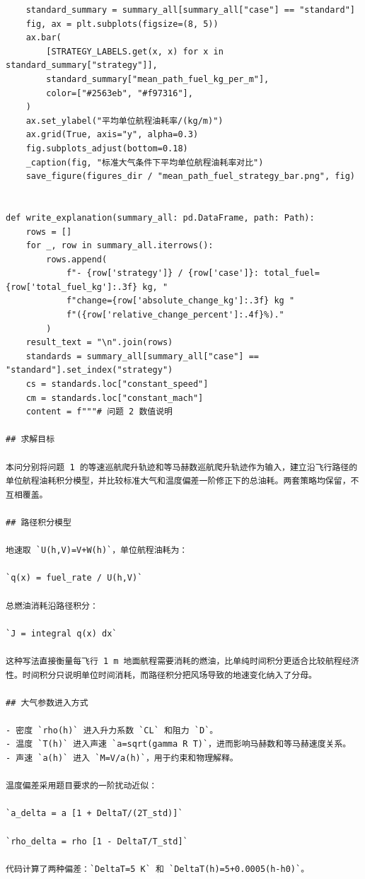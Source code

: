 \documentclass[withoutpreface,bwprint]{cumcmthesis} %
\begin{document}
\begin{center}
\begin{lstlisting}
    standard_summary = summary_all[summary_all["case"] == "standard"]
    fig, ax = plt.subplots(figsize=(8, 5))
    ax.bar(
        [STRATEGY_LABELS.get(x, x) for x in standard_summary["strategy"]],
        standard_summary["mean_path_fuel_kg_per_m"],
        color=["#2563eb", "#f97316"],
    )
    ax.set_ylabel("平均单位航程油耗率/(kg/m)")
    ax.grid(True, axis="y", alpha=0.3)
    fig.subplots_adjust(bottom=0.18)
    _caption(fig, "标准大气条件下平均单位航程油耗率对比")
    save_figure(figures_dir / "mean_path_fuel_strategy_bar.png", fig)


def write_explanation(summary_all: pd.DataFrame, path: Path):
    rows = []
    for _, row in summary_all.iterrows():
        rows.append(
            f"- {row['strategy']} / {row['case']}: total_fuel={row['total_fuel_kg']:.3f} kg, "
            f"change={row['absolute_change_kg']:.3f} kg "
            f"({row['relative_change_percent']:.4f}%)."
        )
    result_text = "\n".join(rows)
    standards = summary_all[summary_all["case"] == "standard"].set_index("strategy")
    cs = standards.loc["constant_speed"]
    cm = standards.loc["constant_mach"]
    content = f"""# 问题 2 数值说明

## 求解目标

本问分别将问题 1 的等速巡航爬升轨迹和等马赫数巡航爬升轨迹作为输入，建立沿飞行路径的单位航程油耗积分模型，并比较标准大气和温度偏差一阶修正下的总油耗。两套策略均保留，不互相覆盖。

## 路径积分模型

地速取 `U(h,V)=V+W(h)`，单位航程油耗为：

`q(x) = fuel_rate / U(h,V)`

总燃油消耗沿路径积分：

`J = integral q(x) dx`

这种写法直接衡量每飞行 1 m 地面航程需要消耗的燃油，比单纯时间积分更适合比较航程经济性。时间积分只说明单位时间消耗，而路径积分把风场导致的地速变化纳入了分母。

## 大气参数进入方式

- 密度 `rho(h)` 进入升力系数 `CL` 和阻力 `D`。
- 温度 `T(h)` 进入声速 `a=sqrt(gamma R T)`，进而影响马赫数和等马赫速度关系。
- 声速 `a(h)` 进入 `M=V/a(h)`，用于约束和物理解释。

温度偏差采用题目要求的一阶扰动近似：

`a_delta = a [1 + DeltaT/(2T_std)]`

`rho_delta = rho [1 - DeltaT/T_std]`

代码计算了两种偏差：`DeltaT=5 K` 和 `DeltaT(h)=5+0.0005(h-h0)`。


\end{lstlisting}
\end{center}
\end{document}
